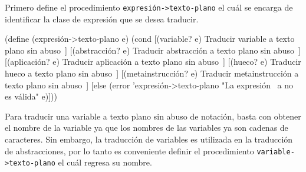 \documentclass[letterpaper,twoside,openright,11pt]{book}
\begin{document}
Primero define el procedimiento {\tt{}\protect{}\protect{}expresión->texto-plano} el cuál se encarga de identificar la clase de expresión que se desea traducir.

\nwenddocs{}\endmoddef
(define (expresión->texto-plano e)
  (cond
   [(variable? e)
    \LA{}Traducir variable a texto plano sin abuso~{\nwtagstyle{}}\RA{}]
   [(abstracción? e)
    \LA{}Traducir abstracción a texto plano sin abuso~{\nwtagstyle{}}\RA{}]
   [(aplicación? e)
    \LA{}Traducir aplicación a texto plano sin abuso~{\nwtagstyle{}}\RA{}]
   [(hueco? e)
    \LA{}Traducir hueco a texto plano sin abuso~{\nwtagstyle{}}\RA{}]
   [(metainstrucción? e)
    \LA{}Traducir metainstrucción a texto plano sin abuso~{\nwtagstyle{}}\RA{}]
   [else
    (error 'expresión->texto-plano
           "La expresión ~a no es válida" e)]))

\eatline
{}\nwendcode{}\nwdocspar

Para traducir una variable a texto plano sin abuso de notación, basta con obtener el nombre de la variable ya que los nombres de las variables ya son cadenas de caracteres. Sin embargo, la traducción de variables es utilizada en la traducción de abstracciones, por lo tanto es conveniente definir el procedimiento {\tt{}\protect{}variable\protect{}->texto-plano} el cuál regresa su nombre.
\end{document}

